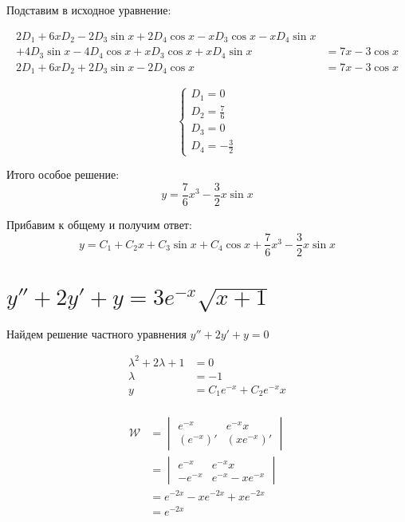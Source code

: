 Подставим в исходное уравнение:

\begin{align*}
    2 D_1 + 6x D_2 - 2D_3\sin x + 2D_4\cos x - xD_3\cos x - xD_4\sin x   \\
    + 4D_3\sin x - 4D_4\cos x + xD_3\cos x + xD_4\sin x & = 7x - 3\cos x \\
    2 D_1 + 6x D_2 + 2D_3\sin x - 2D_4\cos x            & = 7x - 3\cos x
\end{align*}

\[\begin{cases}
        D_1 = 0           \\
        D_2 = \frac{7}{6} \\
        D_3 = 0           \\
        D_4 =- \frac{3}{2}
    \end{cases}\]

Итого особое решение:
\[y = \frac{7}{6} x^3 - \frac{3}{2}x\sin x\]

Прибавим к общему и получим ответ:
\[y = C_1 + C_2x + C_3\sin x + C_4\cos x + \frac{7}{6} x^3 - \frac{3}{2}x\sin x\]

\section{\(y''+2y'+y=3e^{- x}\sqrt{x + 1}\)}

Найдем решение частного уравнения \(y'' + 2y' + y = 0\)

\begin{align*}
    \lambda^2 + 2\lambda + 1 & = 0                           \\
    \lambda                  & = -1                          \\
    y                        & = C_1 e^{ -x} + C_2 e^{ -x} x \\
\end{align*}

\begin{align*}
    \mathcal{W} & = \begin{vmatrix} e^{ - x} & e^{ - x}x \\ (e^{ - x})' & (xe^{ - x})' \end{vmatrix}           \\
                & = \begin{vmatrix} e^{ - x} & e^{ - x}x \\ -e^{ - x} & e^{ - x} - xe^{ - x} \end{vmatrix}           \\
                & = e^{ - 2x} - xe^{ - 2x} + xe^{ - 2x} \\
                & = e^{ - 2x}
\end{align*}

